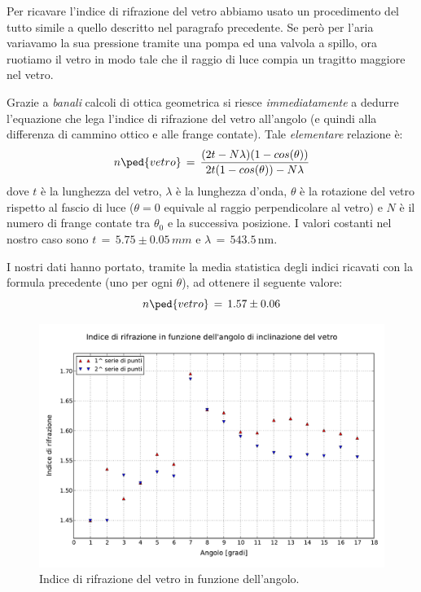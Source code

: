 Per ricavare l'indice di rifrazione del vetro abbiamo usato un procedimento del tutto simile a quello descritto nel paragrafo precedente.
Se però per l'aria variavamo la sua pressione tramite una pompa ed una valvola a spillo, ora ruotiamo il vetro in modo tale che il raggio di luce compia un tragitto maggiore nel vetro. %

Grazie a \emph{banali} calcoli di ottica geometrica si riesce \emph{immediatamente} a dedurre l'equazione che lega l'indice di rifrazione del vetro all'angolo (e quindi alla differenza di cammino ottico e alle frange contate). Tale \emph{elementare} relazione è:
\begin{equation}
	n\ped{vetro} \, = \, \frac{(2t - N \lambda) (1 - cos(\theta))}{2t(1-cos(\theta))-N\lambda}
\end{equation}
dove $t$ è la lunghezza del vetro, $\lambda$ è la lunghezza d'onda, $\theta$ è la rotazione del vetro rispetto al fascio di luce
($\theta = 0$ equivale al raggio perpendicolare al vetro)
e $N$ è il numero di frange contate tra $\theta_0$ e la successiva posizione.
I valori costanti nel nostro caso sono $t \,=\, 5.75 \pm 0.05 \, mm$ e $\lambda \, = \, 543.5 \, \si{\nano\metre}$.

I nostri dati hanno portato, tramite la media statistica degli indici ricavati con la formula precedente (uno per ogni $\theta$),
ad ottenere il seguente valore:
\begin{equation}
	n\ped{vetro} \, = \, 1.57 \pm 0.06
\end{equation}

\begin{figure}[t]
    \centering
        \includegraphics[width=\textwidth]{lol.pdf}
        \caption{Indice di rifrazione del vetro in funzione dell'angolo.}
        \label{fig:enne_theta}
\end{figure}

